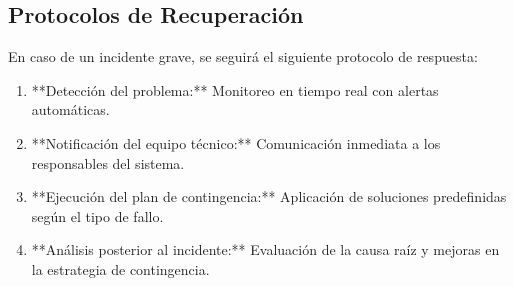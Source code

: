 \subsection{Protocolos de Recuperación}
En caso de un incidente grave, se seguirá el siguiente protocolo de respuesta:
\begin{enumerate}
	\item **Detección del problema:** Monitoreo en tiempo real con alertas automáticas.
	\item **Notificación del equipo técnico:** Comunicación inmediata a los responsables del sistema.
	\item **Ejecución del plan de contingencia:** Aplicación de soluciones predefinidas según el tipo de fallo.
	\item **Análisis posterior al incidente:** Evaluación de la causa raíz y mejoras en la estrategia de contingencia.
\end{enumerate}